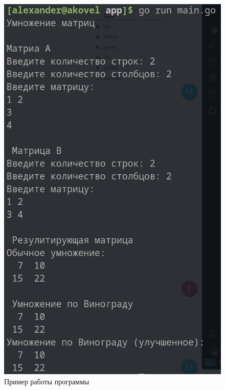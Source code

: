 \begin{figure}[ht!]
	\begin{center}
		\captionsetup{singlelinecheck = false, justification=centerfirst}
		\includegraphics[scale=0.5]{assets/demonstration.png}
		\caption{Пример работы программы}
		\label{demonstration}
	\end{center}
	
	
\end{figure}

\newpage

